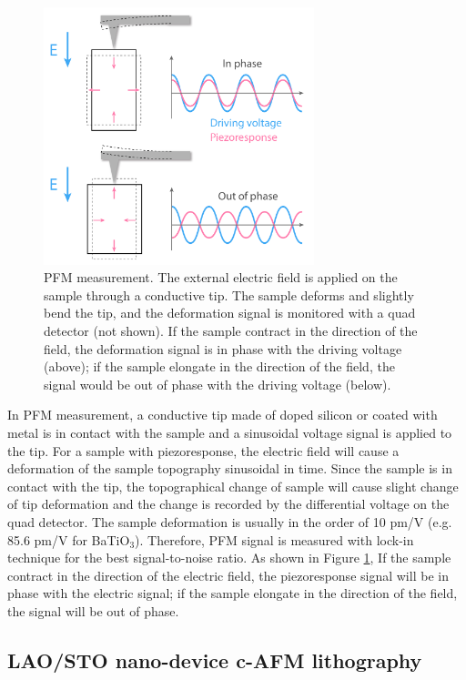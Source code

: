 \documentclass[pdflatex, sectionletters, 12pt]{pittetd}    %
\begin{document}
\begin{figure}[p]
	\centering
	\includegraphics[width=0.7\textwidth]{Drawing/PFM.pdf}
	\caption{PFM measurement. The external electric field is applied on the sample through a conductive tip. The sample deforms and slightly bend the tip, and the deformation signal is monitored with a quad detector (not shown). If the sample contract in the direction of the field, the deformation signal is in phase with the driving voltage (above); if the sample elongate in the direction of the field, the signal would be out of phase with the driving voltage (below).}
	\label{FIG:PFM}
\end{figure}

In PFM measurement, a conductive tip made of doped silicon or coated with metal is in contact with the sample and a sinusoidal voltage signal is applied to the tip. For a sample with piezoresponse, the electric field will cause a deformation of the sample topography sinusoidal in time. Since the sample is in contact with the tip, the topographical change of sample will cause slight change of tip deformation and the change is recorded by the differential voltage on the quad detector. The sample deformation is usually in the order of 10 pm/V (e.g. 85.6 pm/V for BaTiO$_3$\cite{}). Therefore, PFM signal is measured with lock-in technique for the best signal-to-noise ratio. As shown in Figure \ref{FIG:PFM}, If the sample contract in the direction of the electric field, the piezoresponse signal will be in phase with the electric signal; if the sample elongate in the direction of the field, the signal will be out of phase.

\subsection{LAO/STO nano-device c-AFM lithography}
\label{SEC:AFMLitho}
\end{document}
